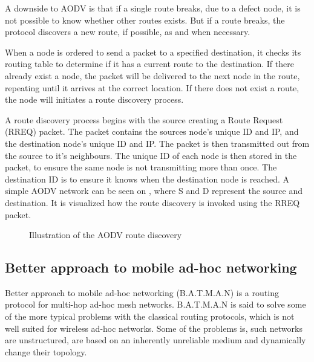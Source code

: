 A downside to AODV is that if a single route breaks, due to a defect node, it is not possible to know whether other routes exists.
But if a route breaks, the protocol discovers a new route, if possible, as and when necessary.

When a node is ordered to send a packet to a specified destination, it checks its routing table to determine if it has a current route to the destination.
If there already exist a node, the packet will be delivered to the next node in the route, repeating until it arrives at the correct location.
If there does not exist a route, the node will initiates a route discovery process\cite{AOVD1}.

A route discovery process begins with the source creating a Route Request (RREQ) packet.
The packet contains the sources node's unique ID and IP, and the destination node's unique ID and IP.
The packet is then transmitted out from the source to it's neighbours.
The unique ID of each node is then stored in the packet, to ensure the same node is not transmitting more than once.
The destination ID is to ensure it knows when the destination node is reached.
A simple AODV network can be seen on , where S and D represent the source and destination. It is visualized how the route discovery is invoked using the RREQ packet.\cite{AOVD2}

\begin{figure}[!h]
	\centering
	\caption{Illustration of the AODV route discovery}
	\label{fig:AODVfigure}
\end{figure}

\subsection{Better approach to mobile ad-hoc networking}
Better approach to mobile ad-hoc networking (B.A.T.M.A.N) is a routing protocol for multi-hop ad-hoc mesh networks. 
B.A.T.M.A.N is said to solve some of the more typical problems with the classical routing protocols, which is not well suited for wireless ad-hoc networks.
Some of the problems is, such networks  are unstructured, are based on an inherently unreliable medium and dynamically change their topology.

